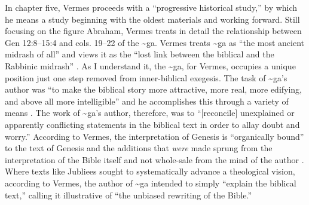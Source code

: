 In chapter five, Vermes proceeds with a ``progressive historical
study,'' by which he means a study beginning with the oldest materials
and working forward. Still focusing on the figure Abraham, Vermes treats
in detail the relationship between Gen 12:8--15:4 and cols. 19--22 of
the \textasciitilde{}ga. Vermes treats \textasciitilde{}ga as ``the most
ancient midrash of all''\autocite[124]{vermes1961} and views it as the
``lost link between the biblical and the Rabbinic midrash''
\autocite[124]{vermes1961}. As I understand it, the \textasciitilde{}ga,
for Vermes, occupies a unique position just one step removed from
inner-biblical exegesis. The task of \textasciitilde{}ga's author was
``to make the biblical story more attractive, more real, more edifying,
and above all more intelligible'' and he accomplishes this through a
variety of means \autocite[125]{vermes1961}. The work of
\textasciitilde{}ga's author, therefore, was to ``{[}reconcile{]}
unexplained or apparently conflicting statements in the biblical text in
order to allay doubt and worry.''\autocite[125]{vermes1961} According to
Vermes, the interpretation of Genesis is ``organically bound'' to the
text of Genesis and the additions that \emph{were} made sprung from the
interpretation of the Bible itself and not whole-sale from the mind of
the author \autocite[126]{vermes1961}. Where texts like Jubliees sought
to systematically advance a theological vision, according to Vermes, the
author of \textasciitilde{}ga intended to simply ``explain the biblical
text,'' calling it illustrative of ``the unbiased rewriting of the
Bible.''\autocite[126]{vermes1961}

